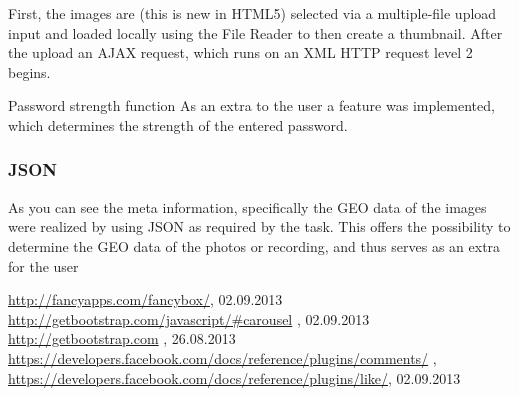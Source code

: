 \documentclass[a4paper,12pt,oneside]{article} %
\begin{document}
First, the images are (this is new in HTML5) selected via a multiple-file upload input and loaded locally using the File Reader to then create a thumbnail. After the upload an AJAX request, which runs on an XML HTTP request level 2 begins.

Password strength function
As an extra to the user a feature was implemented, which determines the strength of the entered password.

\subsubsection{JSON}
As you can see the meta information, specifically the GEO data of the images were realized by using JSON as required by the task. This offers the possibility to determine the GEO data of the photos or recording, and thus serves as an extra for the user

\begin{thebibliography}{}
    \url{http://fancyapps.com/fancybox/}, 02.09.2013
    \url{http://getbootstrap.com/javascript/#carousel} , 02.09.2013
    \url{http://getbootstrap.com} , 26.08.2013
       \url{https://developers.facebook.com/docs/reference/plugins/comments/}
, \url{https://developers.facebook.com/docs/reference/plugins/like/}, 02.09.2013
   



\end{thebibliography}
\end{document}
